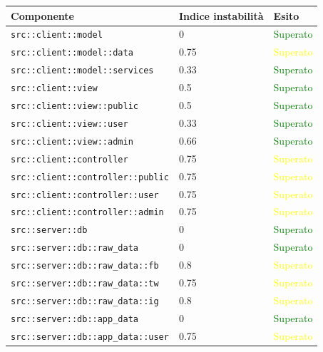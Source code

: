 		\begin{center}

			\def\arraystretch{1.5}
			\bgroup
			\begin{longtable}{| p{8.5cm} | p{3.5cm} | p{3cm} |}
					\hline
					\textbf{Componente} & \textbf{Indice instabilità} & \textbf{Esito}\\
					\hline
					\texttt{src::client::model} & 0 & \textcolor{green}{Superato}\\
					\hline
					\texttt{src::client::model::data} & 0.75 & \textcolor{yellow}{Superato}\\
					\hline
					\texttt{src::client::model::services} & 0.33 & \textcolor{green}{Superato}\\
					\hline
					\texttt{src::client::view} & 0.5 & \textcolor{green}{Superato}\\ 
					\hline
					\texttt{src::client::view::public} & 0.5 & \textcolor{green}{Superato}\\
					\hline
					\texttt{src::client::view::user} & 0.33 & \textcolor{green}{Superato}\\
					\hline
					\texttt{src::client::view::admin} & 0.66 & \textcolor{green}{Superato}\\
					\hline
					\texttt{src::client::controller} &  0.75 & \textcolor{yellow}{Superato}\\
					\hline
					\texttt{src::client::controller::public} & 0.75 & \textcolor{yellow}{Superato}\\
					\hline
					\texttt{src::client::controller::user} & 0.75 & \textcolor{yellow}{Superato}\\
					\hline
					\texttt{src::client::controller::admin} & 0.75 & \textcolor{yellow}{Superato}\\
					\hline
					\texttt{src::server::db} & 0 & \textcolor{green}{Superato}\\
					\hline
					\texttt{src::server::db::raw\_data} & 0 & \textcolor{green}{Superato}\\ 
					\hline
					\texttt{src::server::db::raw\_data::fb} & 0.8 & \textcolor{yellow}{Superato}\\
					\hline
					\texttt{src::server::db::raw\_data::tw} & 0.75 & \textcolor{yellow}{Superato}\\
					\hline
					\texttt{src::server::db::raw\_data::ig} & 0.8 & \textcolor{yellow}{Superato}\\
					\hline
					\texttt{src::server::db::app\_data} & 0 & \textcolor{green}{Superato}\\
					\hline
					\texttt{src::server::db::app\_data::user} & 0.75 & \textcolor{yellow}{Superato}\\

\end{longtable}
\end{center}
